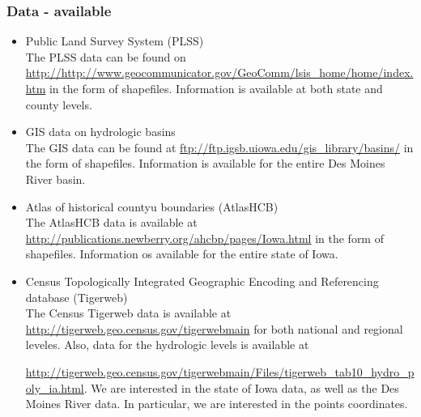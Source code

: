 \documentclass[xcolor=pdftex,dvipsnames,table]{beamer}
\begin{document}
\begin{frame}
\frametitle{Data - available}

\begin{itemize}
\item Public Land Survey System (PLSS)\\

The PLSS data can be found on \href{PLSS}{http://http://www.geocommunicator.gov/GeoComm/lsis_home/home/index.htm} in the form of shapefiles. Information is available at both state and county levels.  
\item   GIS data on hydrologic basins\\

The GIS data can be found at \href{GIS}{ftp://ftp.igsb.uiowa.edu/gis_library/basins/} in the form of shapefiles. Information is available for the entire Des Moines River basin.

\item   Atlas of historical countyu boundaries (AtlasHCB)\\

The AtlasHCB data is available at \href{AtlasHCB}{http://publications.newberry.org/ahcbp/pages/Iowa.html} in the form of shapefiles. Information os available for the entire state of Iowa.

\item Census Topologically Integrated Geographic Encoding and Referencing database (Tigerweb) \\


The Census Tigerweb data is available at \href{Census}{http://tigerweb.geo.census.gov/tigerwebmain} for both national and regional leveles. Also, data for the hydrologic levels is available at 

\href{HydroCensus}{http://tigerweb.geo.census.gov/tigerwebmain/Files/tigerweb_tab10_hydro_poly_ia.html}. We are interested in the state of Iowa data, as well as the Des Moines River data. In particular, we are interested in the points coordinates. 

\end{itemize}


\end{frame}

\end{document}
